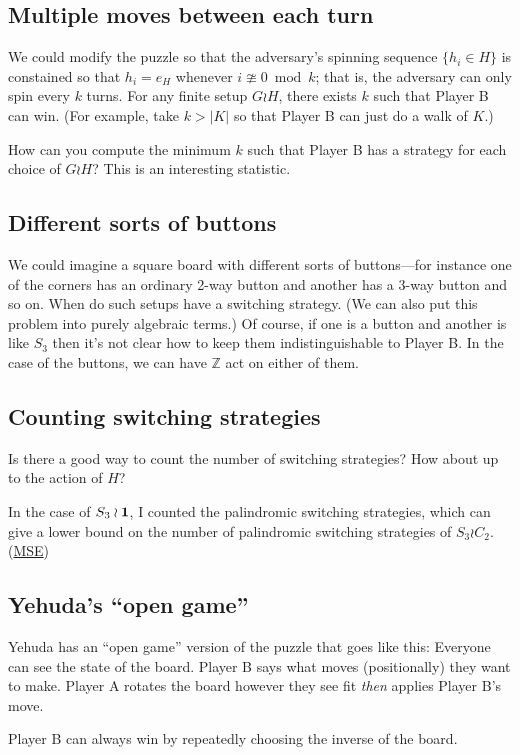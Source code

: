 \subsection{Multiple moves between each turn}
We could modify the puzzle so that the adversary's spinning sequence
$\{h_i \in H\}$ is constained so that $h_i = e_H$ whenever $i \ncong 0 \bmod k$;
that is, the adversary can only spin every $k$ turns. For any finite setup
$G \wr H$, there exists $k$ such that Player B can win.
(For example, take $k > |K|$ so that Player B can just do a walk of $K$.)

How can you compute the minimum $k$ such that Player B has a strategy for each
choice of $G \wr H$? This is an interesting statistic.

\subsection{Different sorts of buttons}
We could imagine a square board with different sorts of buttons---for instance
one of the corners has an ordinary 2-way button and another has a 3-way button
and so on. When do such setups have a switching strategy.
(We can also put this problem into purely algebraic terms.)
Of course, if one is a button and another is like $S_3$ then it's not clear how
to keep them indistinguishable to Player B. In the case of the buttons,
we can have $\mathbb Z$ act on either of them.

\subsection{Counting switching strategies}
Is there a good way to count the number of switching strategies?
How about up to the action of $H$?

In the case of $S_3 \wr \bf{1}$, I counted the palindromic switching
strategies, which can give a lower bound on the number of palindromic
switching strategies of $S_3 \wr C_2$.
(\href{https://math.stackexchange.com/q/3717562/121988}{MSE})

\subsection{Yehuda's ``open game''}
Yehuda has an ``open game'' version of the puzzle that goes like this:
Everyone can see the state of the board.
Player B says what moves (positionally) they want to make.
Player A rotates the board however they see fit \textit{then} applies Player
B's move.
\begin{conjecture}
  Player B can always win by repeatedly choosing the inverse of the board.
\end{conjecture}

